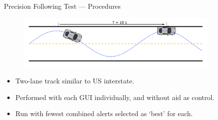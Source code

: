 \documentclass{beamer}
\begin{document}
    \begin{frame}{Precision Following Test --- Procedures}
      \begin{figure}
        \includegraphics[width=10cm]{../graphics/precision_following_diagram.png}
      \end{figure}   
      \begin{itemize} \footnotesize
        \item Two-lane track similar to US interstate.
        \item Performed with each GUI individually, and without aid as control.
        \item Run with fewest combined alerts selected as `best' for each.
      \end{itemize}
    \end{frame}
\end{document}
